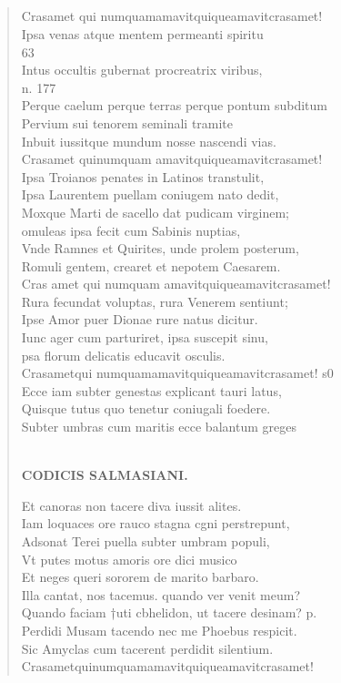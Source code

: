 \documentclass[11pt, a4paper]{report}
\begin{document}
            \subsection*{}
      \begin{verse}
      Crasamet qui numquamamavitquiqueamavitcrasamet! \\ Ipsa venas atque mentem permeanti spiritu \\ 63 \\ Intus occultis gubernat procreatrix viribus, \\ n. 177 \\ Perque caelum perque terras perque pontum subditum \\ Pervium sui tenorem seminali tramite \\ Inbuit iussitque mundum nosse nascendi vias. \\ Crasamet quinumquam amavitquiqueamavitcrasamet! \\ Ipsa Troianos penates in Latinos transtulit, \\ Ipsa Laurentem puellam coniugem nato dedit, \\ Moxque Marti de sacello dat pudicam virginem; \\ omuleas ipsa fecit cum Sabinis nuptias, \\ Vnde Ramnes et Quirites, unde prolem posterum, \\ Romuli gentem, crearet et nepotem Caesarem. \\ Cras amet qui numquam amavitquiqueamavitcrasamet! \\ Rura fecundat voluptas, rura Venerem sentiunt; \\ Ipse Amor puer Dionae rure natus dicitur. \\ Iunc ager cum parturiret, ipsa suscepit sinu, \\ psa florum delicatis educavit osculis. \\ Crasametqui numquamamavitquiqueamavitcrasamet! s0 \\ Ecce iam subter genestas explicant tauri latus, \\ Quisque tutus quo tenetur coniugali foedere. \\ Subter umbras cum maritis ecce balantum greges \\ 
        ﻿\pagebreak 
    \begin{center} \textbf{CODICIS SALMASIANI.} \end{center} \marginpar{[175]} Et canoras non tacere diva iussit alites. \\ Iam loquaces ore rauco stagna cgni perstrepunt, \\ Adsonat Terei puella subter umbram populi, \\ Vt putes motus amoris ore dici musico \\ Et neges queri sororem de marito barbaro. \\ Illa cantat, nos tacemus. quando ver venit meum? \\ Quando faciam †uti cbhelidon, ut tacere desinam? p. \\ Perdidi Musam tacendo nec me Phoebus respicit. \\ Sic Amyclas cum tacerent perdidit silentium. \\ Crasametquinumquamamavitquiqueamavitcrasamet! \\ 

\end{verse}
\end{document}
